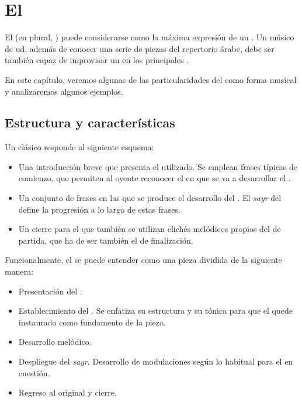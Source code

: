 
\chapter{El \taqsim}
\label{taqsim2}

El \taqsim (en plural, \taqasimb) puede considerarse como la máxima expresión de un \maqamb. Un músico de ud, además de conocer una serie de piezas del repertorio árabe, debe ser también capaz de improvisar un \taqsim en los principales \maqamaatb.

En este capítulo, veremos algunas de las particularidades del \taqsim como forma musical y analizaremos algunos ejemplos.

\section{Estructura y características}

Un \taqsim clásico responde al siguiente esquema:

\begin{itemize}
\item Una introducción breve que presenta el \maqam utilizado. Se emplean frases típicas de comienzo, que permiten al oyente reconocer el \maqam en que se va a desarrollar el \taqsimb.
\item Un conjunto de frases en las que se produce el desarrollo del \taqsimb. El \emph{sayr} del \maqam define la progresión a lo largo de estas frases.
\item Un cierre para el que también se utilizan clichés melódicos propios del \maqam de partida, que ha de ser también el de finalización.
\end{itemize}

Funcionalmente, el \taqsim se puede entender como una pieza dividida de la siguiente manera:

\begin{itemize}
\item Presentación del \maqamb.
\item Establecimiento del \maqamb. Se enfatiza su estructura y su tónica para que el \maqam quede instaurado como fundamento de la pieza.
\item Desarrollo melódico.
\item Despliegue del \emph{sayr}. Desarrollo de modulaciones según lo habitual para el \maqam en cuestión.
\item Regreso al \maqam original y cierre.
\end{itemize}

